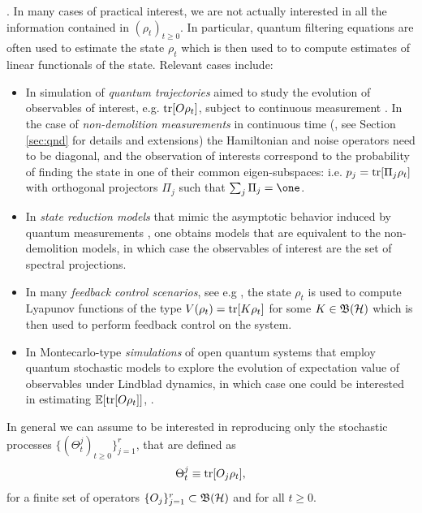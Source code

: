 \documentclass[aihp,12pt]{imsart}
\begin{document}
. 
In many cases of practical interest, we are not actually interested in all the information contained in $(\rho_t)_{t\geq0}$. In particular, quantum filtering equations are often used to estimate the state $\rho_t$ which is then used to to compute estimates of linear functionals of the state. Relevant cases include:
\begin{itemize}
    \item In simulation of {\em quantum trajectories} aimed to study the evolution of observables of interest, e.g. ${\rm tr}[O \rho_t]$, subject to continuous measurement \cite{tirrito_full_2023}. In the case of {\em non-demolition measurements} in continuous time (\cite{Benoist_2014,bauer2013repeated,bauer2011convergence,cardona2020exponential,benoist2024exponentially}, see Section \ref{sec:qnd} for details and extensions) the Hamiltonian and noise operators need to be diagonal, and the observation of interests correspond to the probability of finding the state in one of their  common eigen-subspaces: i.e. $p_j = {\rm tr}[\Pi_j \rho_t]$ with orthogonal projectors $\Pi_j$ such that $\sum_j \Pi_j = \one$.
    
    \item In {\em state reduction models} that mimic the asymptotic behavior induced by quantum measurements \cite{adler2001martingale, Adler_2008}, one obtains models that are equivalent to the non-demolition models, in which case the observables of interest are the  set of spectral projections. 
    \item  In many {\em feedback control scenarios}, see e.g \cite{amini2012stabilization,grigoletto2021stabilization,liang2022switching, benoist2017exponential}, the state $\rho_t$ is used to compute Lyapunov functions of the type $V(\rho_t) = {\rm tr}[K\rho_t]$ for some $K\in\mathfrak{B}(\mathcal{H})$ which is then used to perform feedback control on the system.
   
    \item In Montecarlo-type {\em simulations} of open quantum systems that employ quantum stochastic models to explore the evolution of expectation value of observables under Lindblad dynamics, in which case one could be interested in estimating $\mathbb{E}[{\rm tr}[O\rho_t]]$, \cite{PhysRevB.105.064305}.
    
\end{itemize}
In general we can assume to be interested in reproducing only the stochastic processes $\{(\Theta_t^j)_{t\geq0}\}_{j=1}^r$, that are defined as 
\begin{equation}
    \Theta_t^j \equiv {\rm tr}[O_j\rho_t],
    \label{eq:output_equation}
\end{equation} for a finite set of operators $\{O_j\}_{j=1}^r\subset\mathfrak{B}(\mathcal{H})$ and for all $t\geq0$. 
\end{document}
